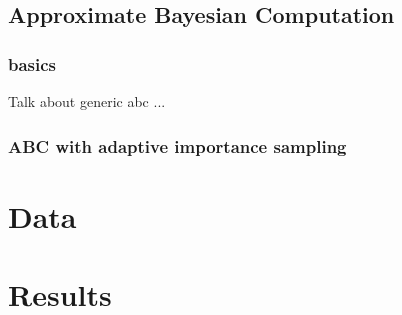\documentclass[12pt, preprint]{aastex}
\begin{document}
\subsection{Approximate Bayesian Computation}

\subsubsection{basics}

Talk about generic abc ...

\subsubsection{ABC with adaptive importance sampling}






\section{Data}




\section{Results}


\begin{thebibliography}{70}


\end{thebibliography}
\end{document}
